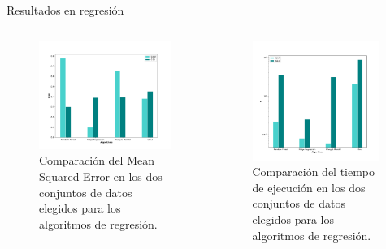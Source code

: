 \documentclass[10pt, spanish]{beamer}
\begin{document}
\begin{frame}{Resultados en regresión}
\begin{columns}[T]
\begin{column}{.48\textwidth}

\begin{figure}
	\centering
	\includegraphics[width=1.1\textwidth]{img/mse-reg}
	\caption{\footnotesize Comparación del Mean Squared Error en los dos conjuntos de datos elegidos para los algoritmos de regresión.}
\end{figure}
\end{column}%
\hfill%
\begin{column}{.48\textwidth}

  \begin{figure}
	\centering
	\includegraphics[width=0.97\textwidth]{img/time-reg}
	\caption{\footnotesize Comparación del tiempo de ejecución en los dos conjuntos de datos elegidos para los algoritmos de regresión.}
\end{figure}
\end{column}%
\end{columns}
\end{frame}
\end{document}
